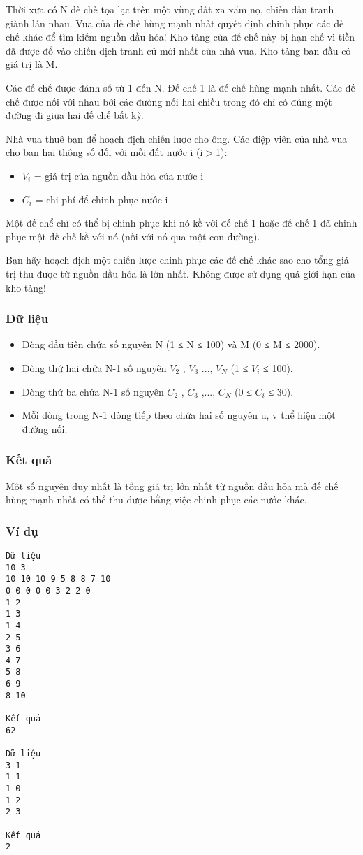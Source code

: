 

Thời xưa có N đế chế tọa lạc trên một vùng đất xa xăm nọ, chiến đấu tranh giành lẫn nhau. Vua của đế chế hùng mạnh nhất quyết định chinh phục các đế chế khác để tìm kiếm nguồn dầu hỏa! Kho tàng của đế chế này bị hạn chế vì tiền đã được đổ vào chiến dịch tranh cử mới nhất của nhà vua. Kho tàng ban đầu có giá trị là M.

Các đế chế được đánh số từ 1 đến N. Đế chế 1 là đế chế hùng mạnh nhất. Các đế chế được nối với nhau bởi các đường nối hai chiều trong đó chỉ có đúng một đường đi giữa hai đế chế bất kỳ.

Nhà vua thuê bạn để hoạch địch chiến lược cho ông. Các điệp viên của nhà vua cho bạn hai thông số đối với mỗi đất nước i (i$>$1):
\begin{itemize}
	\item $V_{i}$ = giá trị của nguồn dầu hỏa của nước i
	\item $C_{i}$ = chi phí để chinh phục nước i
\end{itemize}

Một đế chể chỉ có thể bị chinh phục khi nó kề với đế chế 1 hoặc đế chế 1 đã chinh phục một đế chế kề với nó (nối với nó qua một con đường).

Bạn hãy hoạch địch một chiến lược chinh phục các đế chế khác sao cho tổng giá trị thu được từ nguồn dầu hỏa là lớn nhất. Không được sử dụng quá giới hạn của kho tàng!

\subsubsection{Dữ liệu}
\begin{itemize}
	\item Dòng đầu tiên chứa số nguyên N (1 ≤ N ≤ 100) và M (0 ≤ M ≤ 2000).
	\item Dòng thứ hai chứa N-1 số nguyên $V_{2}$ , $V_{3}$ ..., $V_{N}$ (1 ≤ $V_{i}$ ≤ 100).
	\item Dòng thứ ba chứa N-1 số nguyên $C_{2}$ , $C_{3}$ ,..., $C_{N}$ (0 ≤ $C_{i}$ ≤ 30).
	\item Mỗi dòng trong N-1 dòng tiếp theo chứa hai số nguyên u, v thể hiện một đường nối.
\end{itemize}

\subsubsection{Kết quả}

Một số nguyên duy nhất là tổng giá trị lớn nhất từ nguồn dầu hỏa mà đế chế hùng mạnh nhất có thể thu được bằng việc chinh phục các nước khác.

\subsubsection{Ví dụ}
\begin{verbatim}
Dữ liệu
10 3
10 10 10 9 5 8 8 7 10
0 0 0 0 0 3 2 2 0
1 2
1 3
1 4
2 5
3 6
4 7
5 8
6 9
8 10

Kết quả
62

Dữ liệu
3 1
1 1
1 0
1 2
2 3

Kết quả
2
\end{verbatim}
